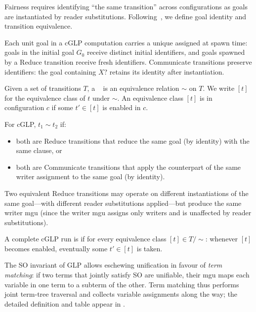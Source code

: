 Fairness requires identifying ``the same transition'' across configurations as goals are instantiated by reader substitutions. Following~\cite{lewis2026volitional}, we define goal identity and transition equivalence.

\begin{definition}
\label{def:goal-identity}
Each unit goal in a cGLP computation carries a unique  assigned at spawn time: goals in the initial goal $G_0$ receive distinct initial identifiers, and goals spawned by a Reduce transition receive fresh identifiers. Communicate transitions preserve identifiers: the goal containing $X?$ retains its identity after instantiation.
\end{definition}

\begin{definition}
\label{def:transition-equivalence}
Given a set of transitions $T$, a ~\cite{lewis2026volitional} is an equivalence relation $\sim$ on $T$. We write $[t]$ for the equivalence class of $t$ under $\sim$. An equivalence class $[t]$ is  in configuration $c$ if some $t' \in [t]$ is enabled in $c$.

For cGLP, $t_1 \sim t_2$ if:
\begin{itemize}
\item both are Reduce transitions that reduce the same goal (by identity) with the same clause, or
\item both are Communicate transitions that apply the counterpart of the same writer assignment to the same goal (by identity).
\end{itemize}
\end{definition}

Two equivalent Reduce transitions may operate on different instantiations of the same goal---with different reader substitutions applied---but produce the same writer mgu (since the writer mgu assigns only writers and is unaffected by reader substitutions).

\begin{definition}
\label{def:cglp-fair-run}
A complete cGLP run is  if for every equivalence class $[t] \in T/{\sim}$: whenever $[t]$ becomes enabled, eventually some $t' \in [t]$ is taken.
\end{definition}

The SO invariant of GLP allows eschewing unification in favour of \emph{term matching}: if two terms that jointly satisfy SO are unifiable, their mgu maps each variable in one term to a subterm of the other. Term matching thus performs joint term-tree traversal and collects variable assignments along the way; the detailed definition and table appear in .

